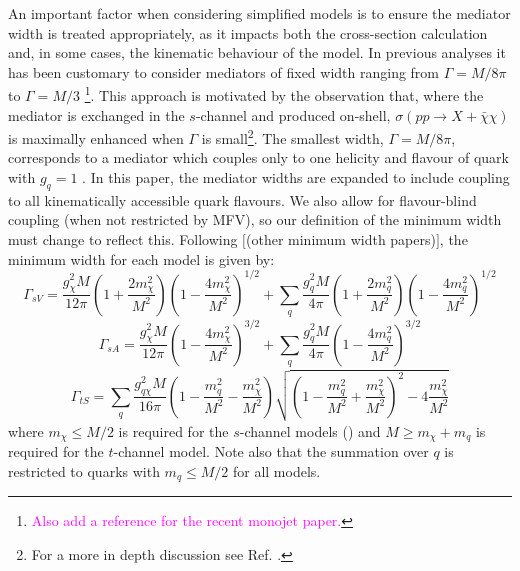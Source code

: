 An important factor when considering simplified models is to ensure the mediator width is treated appropriately, as it impacts both the cross-section calculation and, in some cases, the kinematic behaviour of the model. In previous analyses it has been customary to consider mediators of fixed width ranging from $\Gamma = M/8\pi$ to $\Gamma = M/3$ \cite{METSig, Fox:2012ee} \footnote{\textcolor{magenta}{Also add a reference for the recent monojet paper.}}. This approach is motivated by the observation that, where the mediator is exchanged in the $s$-channel and produced on-shell, $\sigma\left(pp \rightarrow X + \bar{\chi}\chi\right)$ is maximally enhanced when $\Gamma$ is small\footnote{For a more in depth discussion see Ref. \cite{METSig}.}. The smallest width, $\Gamma = M/8\pi$, corresponds to a mediator which couples only to one helicity and flavour of quark with $g_{q} = 1$ \cite{METSig}. In this paper, the mediator widths are expanded to include coupling to all kinematically accessible quark flavours. We also allow for flavour-blind coupling (when not restricted by MFV), so our definition of the minimum width must change to reflect this. Following $[$(other minimum width papers)$]$, the minimum width for each model is given by:
\begin{equation}
\label{gamma_sV}
\Gamma_{sV} = \frac{g_{\chi}^2 M}{12\pi}\left(1 + \frac{2m_{\chi}^{2}}{M^{2}}\right)\left(1 - \frac{4m_{\chi}^{2}}{M^{2}}\right)^{1/2} + \sum_{\substack{q}}\frac{g_q^2M}{4\pi}\left(1 + \frac{2m_{q}^{2}}{M^{2}}\right)\left(1 - \frac{4m_{q}^{2}}{M^{2}}\right)^{1/2}
\end{equation}
\begin{equation}
\label{gamma_sA}
\Gamma_{sA} = \frac{g_{\chi}^2 M}{12\pi}\left(1 - \frac{4m_{\chi}^{2}}{M^{2}}\right)^{3/2} + \sum_{\substack{q}}\frac{g_q^2 M}{4\pi}\left(1 - \frac{4m_{q}^{2}}{M^{2}}\right)^{3/2}
\end{equation}
\begin{equation}
\label{gamma_tS}
\Gamma_{tS} = \sum_{\substack{q}} \frac{g_{q\chi}^2M}{16\pi}\left(1 - \frac{m_{q}^{2}}{M^{2}} - \frac{m_{\chi}^{2}}{M^{2}}\right)\sqrt{\left(1 - \frac{m_{q}^{2}}{M^{2}} + \frac{m_{\chi}^{2}}{M^{2}}\right)^{2} - 4\frac{m_{\chi}^{2}}{M^{2}}}
\end{equation}
where $m_{\chi} \leq M/2$ is required for the $s$-channel models () and $M \geq m_{\chi} + m_{q}$ is required for the $t$-channel model. Note also that the summation over $q$ is restricted to quarks with $m_{q} \leq M/2$ for all models. 

